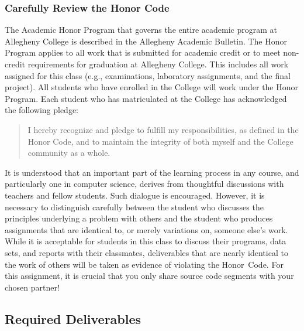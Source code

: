 \vspace*{-.2in}
\subsubsection*{Carefully Review the Honor Code}
\vspace*{-.05in}

The Academic Honor Program that governs the entire academic program at Allegheny College is described in the Allegheny
Academic Bulletin.  The Honor Program applies to all work that is submitted for academic credit or to meet non-credit
requirements for graduation at Allegheny College.  This includes all work assigned for this class (e.g., examinations,
  laboratory assignments, and the final project).  All students who have enrolled in the College will work under the Honor
Program.  Each student who has matriculated at the College has acknowledged the following pledge:

\vspace*{-.05in}
\begin{quote}
  I hereby recognize and pledge to fulfill my responsibilities, as defined in the Honor Code, and to maintain the
  integrity of both myself and the College community as a whole.
\end{quote}
\vspace*{-.05in}

\noindent It is understood that an important part of the learning process in any course, and particularly one in
computer science, derives from thoughtful discussions with teachers and fellow students.  Such dialogue is encouraged.
However, it is necessary to distinguish carefully between the student who discusses the principles underlying a problem
with others and the student who produces assignments that are identical to, or merely variations on, someone else's
work.  While it is acceptable for students in this class to discuss their programs, data sets, and reports with their
classmates, deliverables that are nearly identical to the work of others will be taken as evidence of violating the
\mbox{Honor Code}. For this assignment, it is crucial that you only share source code segments with your chosen partner!

\vspace*{-.15in}
\subsection*{Required Deliverables}
\vspace*{-.05in}

